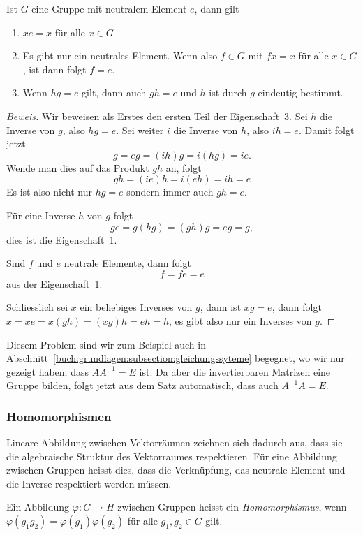 \begin{satz}
\label{buch:vektorenmatrizen:satz:gruppenregeln}
Ist $G$ eine Gruppe mit neutralem Element $e$, dann gilt
\begin{enumerate}
\item
$xe=x$ für alle $x\in G$
\item
Es gibt nur ein neutrales Element.
Wenn also $f\in G$ mit $fx=x$ für alle $x\in G$, ist dann folgt $f=e$.
\item 
Wenn $hg=e$ gilt, dann auch $gh=e$ und $h$ ist durch $g$ eindeutig bestimmt.
\end{enumerate}
\end{satz}

\begin{proof}[Beweis]
Wir beweisen als Erstes den ersten Teil der Eigenschaft~3.
Sei $h$ die Inverse von $g$, also $hg=e$.
Sei weiter $i$ die Inverse von $h$, also $ih=e$.
Damit folgt jetzt
\[
g
=
eg
=
(ih)g
=
i(hg)
=
ie.
\]
Wende man dies auf das Produkt $gh$ an, folgt
\[
gh
=
(ie)h
=
i(eh)
=
ih
=
e
\]
Es ist also nicht nur $hg=e$ sondern immer auch $gh=e$.

Für eine Inverse $h$ von $g$ folgt
\[
ge
=
g(hg)
=
(gh)g
=
eg
=
g,
\]
dies ist die Eigenschaft~1.

Sind $f$ und $e$ neutrale Elemente, dann folgt
\[
f = fe = e
\]
aus der Eigenschaft~1.

Schliesslich sei $x$ ein beliebiges Inverses von $g$, dann ist
$xg=e$, dann folgt
$x=xe=x(gh)=(xg)h = eh = h$, es gibt also nur ein Inverses von $g$.
\end{proof}

Diesem Problem sind wir zum Beispiel auch in
Abschnitt~\ref{buch:grundlagen:subsection:gleichungssyteme}
begegnet, wo wir nur gezeigt haben, dass $AA^{-1}=E$ ist.
Da aber die invertierbaren Matrizen eine Gruppe
bilden, folgt jetzt aus dem Satz automatisch, dass auch $A^{-1}A=E$.

\subsubsection{Homomorphismen}
Lineare Abbildung zwischen Vektorräumen zeichnen sich dadurch aus,
dass sie die algebraische Struktur des Vektorraumes respektieren.
Für eine Abbildung zwischen Gruppen heisst dies, dass die Verknüpfung,
das neutrale Element und die Inverse respektiert werden müssen.

\begin{definition}
Ein Abbildung $\varphi\colon G\to H$ zwischen Gruppen heisst ein
{\em Homomorphismus}, wenn 
$\varphi(g_1g_2)=\varphi(g_1)\varphi(g_2)$ für alle $g_1,g_2\in G$ gilt.
%
\end{definition}

